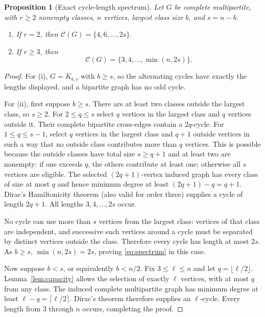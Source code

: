 \documentclass[11pt,letterpaper]{article}
\newtheorem{proposition}[theorem]{Proposition}
\newcommand{\cset}{\mathcal{C}}
\begin{document}
\begin{proposition}[Exact cycle-length spectrum]\label{prop:spectrum}
Let $G$ be complete multipartite, with $r\ge2$ nonempty classes,
$n$ vertices, largest class size $b$, and $s=n-b$.
\begin{enumerate}[label=(\roman*),itemsep=0.2em]
\item If $r=2$, then $\cset(G)=\{4,6,\ldots,2s\}$.
\item If $r\ge3$, then
\begin{equation}\label{eq:spectrum}
\cset(G)=\{3,4,\ldots,\min(n,2s)\}.
\end{equation}
\end{enumerate}
\end{proposition}
\begin{proof}
For (i), $G=K_{b,s}$ with $b\ge s$, so the alternating cycles have
exactly the lengths displayed, and a bipartite graph has no odd cycle.

For (ii), first suppose $b\ge s$.  There are at least two classes
outside the largest class, so $s\ge2$.
For $2\le q\le s$ select $q$ vertices in the largest class and
$q$ vertices outside it.  Their complete bipartite cross-edges
contain a $2q$-cycle.
For $1\le q\le s-1$, select $q$ vertices in the largest class and
$q+1$ outside vertices in such a way that no outside class
contributes more than $q$ vertices.  This is possible because the
outside classes have total size $s\ge q+1$ and at least two are
nonempty: if one exceeds $q$, the others contribute at least one;
otherwise all $s$ vertices are eligible.  The selected $(2q+1)$-vertex
induced graph has every class of size at most $q$ and hence minimum
degree at least $(2q+1)-q=q+1$.  Dirac's Hamiltonicity theorem
\cite{Dirac} (also valid for order three) supplies a cycle of length
$2q+1$.  All lengths $3,4,\ldots,2s$ occur.

No cycle can use more than $s$ vertices from the largest class:
vertices of that class are independent, and successive such vertices
around a cycle must be separated by distinct vertices outside the class.
Therefore every cycle has length at most $2s$.  As $b\ge s$,
$\min(n,2s)=2s$, proving \eqref{eq:spectrum} in this case.

Now suppose $b<s$, or equivalently $b<n/2$.  Fix $3\le\ell\le n$
and let $q=\lfloor\ell/2\rfloor$.  Lemma~\ref{lem:capacity}
allows the selection of exactly $\ell$ vertices, with at most $q$
from any class.  The induced complete multipartite graph has minimum
degree at least $\ell-q=\lceil\ell/2\rceil$.  Dirac's theorem
therefore supplies an $\ell$-cycle.  Every length from 3 through
$n$ occurs, completing the proof.
\end{proof}
\end{document}
